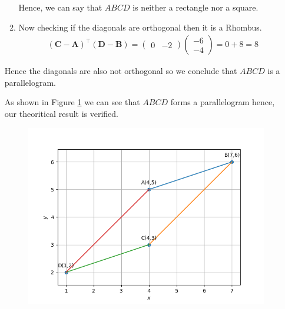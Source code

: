 \documentclass[12pt]{article}
\newcommand{\myvec}[1]{\ensuremath{\begin{pmatrix}#1\end{pmatrix}}}
\let\vec\mathbf
\begin{document}
\begin{enumerate}
\begin{enumerate}
	Hence, we can say that $ABCD$ is neither a rectangle nor a square.

		\item Now checking if the diagonals are orthogonal then it is a Rhombus.
	\begin{align}
		(\vec{C}- \vec{A})^\top (\vec{D}-\vec{B}) = \myvec{0&-2} \myvec{-6\\-4} = 0+8 = 8
	\end{align}
	\end{enumerate}		
	Hence the diagonals are also not orthogonal so we conclude that $ABCD$ is a parallelogram.

	As shown in Figure \ref{fig:10/7/1/6/Fig3} we can see that $ABCD$ forms a parallelogram hence, our theoritical result is verified.

\begin{figure}[!h]
	\begin{center} 
	    \includegraphics[width=\columnwidth]{chapters/10/7/1/6/figs/quad3}
	\end{center}
\caption{}
\label{fig:10/7/1/6/Fig3}
\end{figure}
\end{enumerate}
\end{document}
